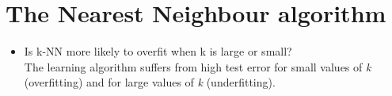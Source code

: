 \newpage
\section{The Nearest Neighbour algorithm}

\begin{itemize}
    
    \item Is k-NN more likely to overfit when k is large or small?\\

        The learning algorithm suffers from high test error for small values of \textit{k} (overfitting) and for large values of \textit{k} (underfitting).

\end{itemize}
